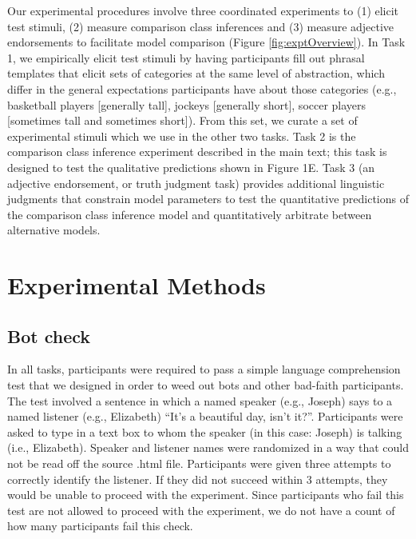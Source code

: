 \documentclass[doc]{apa6}
\begin{document}
Our experimental procedures involve three coordinated experiments to (1) elicit test stimuli, (2) measure comparison class inferences and (3) measure adjective endorsements to facilitate model comparison (Figure \ref{fig:exptOverview}). 
In Task 1, we empirically elicit test stimuli by having participants fill out phrasal templates that elicit sets of categories at the same level of abstraction, which differ in the general expectations participants have about those categories (e.g., basketball players [generally tall], jockeys [generally short], soccer players [sometimes tall and sometimes short]). 
From this set, we curate a set of experimental stimuli which we use in the other two tasks.
Task 2 is the comparison class inference experiment described in the main text; this task is designed to test the qualitative predictions shown in Figure 1E.
Task 3 (an adjective endorsement, or truth judgment task) provides additional linguistic judgments that constrain model parameters to test the quantitative predictions of the comparison class inference model and quantitatively arbitrate between alternative models. 

\section{Experimental Methods}

\subsection{Bot check}

In all tasks, participants were required to pass a simple language comprehension test that we designed in order to weed out bots and other bad-faith participants. 
The test involved a sentence in which a named speaker (e.g., Joseph) says to a named listener (e.g., Elizabeth) ``It's a beautiful day, isn't it?''. 
Participants were asked to type in a text box to whom the speaker (in this case: Joseph) is talking (i.e., Elizabeth).
Speaker and listener names were randomized in a way that could not be read off the source .html file.
Participants were given three attempts to correctly identify the listener. 
If they did not succeed within 3 attempts, they would be unable to proceed with the experiment.
Since participants who fail this test are not allowed to proceed with the experiment, we do not have a count of how many participants fail this check.
\end{document}
